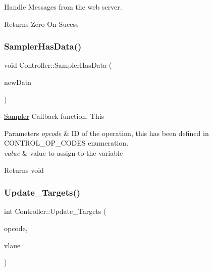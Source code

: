 Handle Messages from the web server.

\begin{DoxyReturn}{Returns}
Zero On Sucess 
\end{DoxyReturn}
\mbox{\label{classController_a4b765eaaf8f72e964118967f86c265e2}} 
\subsubsection{\texorpdfstring{Sampler\+Has\+Data()}{SamplerHasData()}}
{\footnotesize\ttfamily void Controller\+::\+Sampler\+Has\+Data (\begin{DoxyParamCaption}\item[{\hyperlink{structEnvironmentData}{Environment\+Data}}]{new\+Data }\end{DoxyParamCaption})}

\hyperlink{classSampler}{Sampler} Callback function. This


\begin{DoxyParams}{Parameters}
{\em opcode} & ID of the operation, this has been defined in C\+O\+N\+T\+R\+O\+L\+\_\+\+O\+P\+\_\+\+C\+O\+D\+ES enumeration. \\
\hline
{\em value} & value to assign to the variable\\
\hline
\end{DoxyParams}
\begin{DoxyReturn}{Returns}
void 
\end{DoxyReturn}
\mbox{\label{classController_a0eb08a1d38b2c79e2d140476fd097f24}} 
\subsubsection{\texorpdfstring{Update\+\_\+\+Targets()}{Update\_Targets()}}
{\footnotesize\ttfamily int Controller\+::\+Update\+\_\+\+Targets (\begin{DoxyParamCaption}\item[{uint8\+\_\+t}]{opcode,  }\item[{float}]{vlaue }\end{DoxyParamCaption})}

\mbox{\label{classController_a841b5219b4f48dbfd7b01fab727e7a2c}} 
